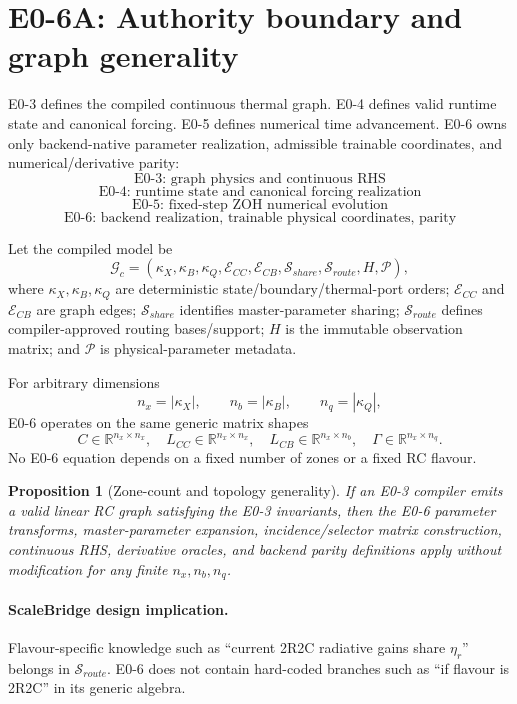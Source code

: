 \documentclass[11pt]{article}
\newcommand{\R}{\mathbb{R}}
\newtheorem{proposition}{Proposition}
\begin{document}
\section{E0-6A: Authority boundary and graph generality}

E0-3 defines the compiled continuous thermal graph. E0-4 defines valid runtime
state and canonical forcing. E0-5 defines numerical time advancement. E0-6 owns
only backend-native parameter realization, admissible trainable coordinates,
and numerical/derivative parity:
\[
\boxed{\text{E0-3: graph physics and continuous RHS}}
\]
\[
\boxed{\text{E0-4: runtime state and canonical forcing realization}}
\]
\[
\boxed{\text{E0-5: fixed-step ZOH numerical evolution}}
\]
\[
\boxed{\text{E0-6: backend realization, trainable physical coordinates, parity}}
\]

Let the compiled model be
\[
\mathcal G_c=
(\kappa_X,\kappa_B,\kappa_Q,
\mathcal E_{CC},\mathcal E_{CB},
\mathcal S_{share},\mathcal S_{route},H,\mathcal P),
\]
where $\kappa_X,\kappa_B,\kappa_Q$ are deterministic state/boundary/thermal-port
orders; $\mathcal E_{CC}$ and $\mathcal E_{CB}$ are graph edges;
$\mathcal S_{share}$ identifies master-parameter sharing; $\mathcal S_{route}$
defines compiler-approved routing bases/support; $H$ is the immutable observation
matrix; and $\mathcal P$ is physical-parameter metadata.

For arbitrary dimensions
\[
n_x=|\kappa_X|,\qquad n_b=|\kappa_B|,\qquad n_q=|\kappa_Q|,
\]
E0-6 operates on the same generic matrix shapes
\[
C\in\R^{n_x\times n_x},\quad
L_{CC}\in\R^{n_x\times n_x},\quad
L_{CB}\in\R^{n_x\times n_b},\quad
\Gamma\in\R^{n_x\times n_q}.
\]
No E0-6 equation depends on a fixed number of zones or a fixed RC flavour.

\begin{proposition}[Zone-count and topology generality]
If an E0-3 compiler emits a valid linear RC graph satisfying the E0-3
invariants, then the E0-6 parameter transforms, master-parameter expansion,
incidence/selector matrix construction, continuous RHS, derivative oracles, and
backend parity definitions apply without modification for any finite $n_x,n_b,n_q$.
\end{proposition}

\paragraph{ScaleBridge design implication.}
Flavour-specific knowledge such as ``current 2R2C radiative gains share
$\eta_r$'' belongs in $\mathcal S_{route}$. E0-6 does not contain hard-coded
branches such as ``if flavour is 2R2C'' in its generic algebra.
\end{document}
